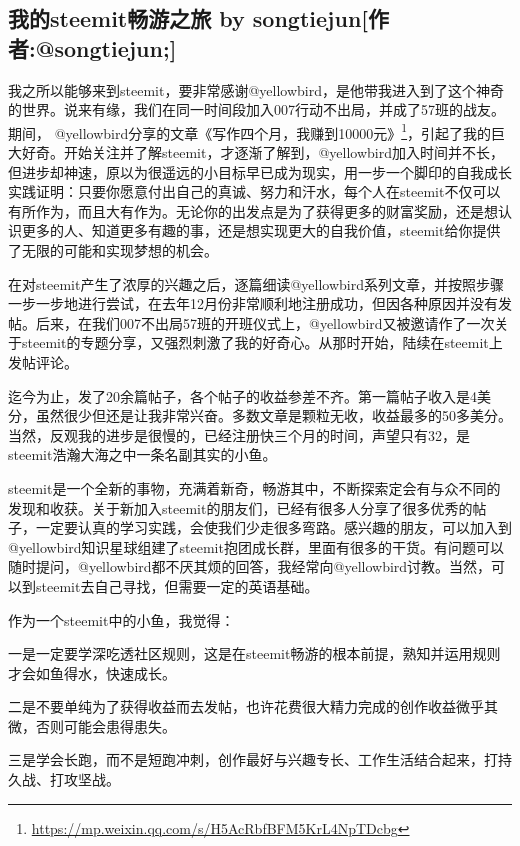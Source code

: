 \documentclass[]{ctexbook}
\renewcommand{\href}[2]{#2\footnote{\url{#1}}}
\begin{document}
\hypertarget{steemit-by-songtiejunsongtiejun}{%
\subsection{我的steemit畅游之旅 by songtiejun{[}作者:@songtiejun;{]}}\label{steemit-by-songtiejunsongtiejun}}

我之所以能够来到steemit，要非常感谢@yellowbird，是他带我进入到了这个神奇的世界。说来有缘，我们在同一时间段加入007行动不出局，并成了57班的战友。期间， @yellowbird分享的文章\href{https://mp.weixin.qq.com/s/H5AcRbfBFM5KrL4NpTDcbg}{《写作四个月，我赚到10000元》}，引起了我的巨大好奇。开始关注并了解steemit，才逐渐了解到，@yellowbird加入时间并不长，但进步却神速，原以为很遥远的小目标早已成为现实，用一步一个脚印的自我成长实践证明：只要你愿意付出自己的真诚、努力和汗水，每个人在steemit不仅可以有所作为，而且大有作为。无论你的出发点是为了获得更多的财富奖励，还是想认识更多的人、知道更多有趣的事，还是想实现更大的自我价值，steemit给你提供了无限的可能和实现梦想的机会。

在对steemit产生了浓厚的兴趣之后，逐篇细读@yellowbird系列文章，并按照步骤一步一步地进行尝试，在去年12月份非常顺利地注册成功，但因各种原因并没有发帖。后来，在我们007不出局57班的开班仪式上，@yellowbird又被邀请作了一次关于steemit的专题分享，又强烈刺激了我的好奇心。从那时开始，陆续在steemit上发帖评论。

迄今为止，发了20余篇帖子，各个帖子的收益参差不齐。第一篇帖子收入是4美分，虽然很少但还是让我非常兴奋。多数文章是颗粒无收，收益最多的50多美分。当然，反观我的进步是很慢的，已经注册快三个月的时间，声望只有32，是steemit浩瀚大海之中一条名副其实的小鱼。

steemit是一个全新的事物，充满着新奇，畅游其中，不断探索定会有与众不同的发现和收获。关于新加入steemit的朋友们，已经有很多人分享了很多优秀的帖子，一定要认真的学习实践，会使我们少走很多弯路。感兴趣的朋友，可以加入到@yellowbird知识星球组建了steemit抱团成长群，里面有很多的干货。有问题可以随时提问，@yellowbird都不厌其烦的回答，我经常向@yellowbird讨教。当然，可以到steemit去自己寻找，但需要一定的英语基础。

作为一个steemit中的小鱼，我觉得：

一是一定要学深吃透社区规则，这是在steemit畅游的根本前提，熟知并运用规则才会如鱼得水，快速成长。

二是不要单纯为了获得收益而去发帖，也许花费很大精力完成的创作收益微乎其微，否则可能会患得患失。

三是学会长跑，而不是短跑冲刺，创作最好与兴趣专长、工作生活结合起来，打持久战、打攻坚战。
\end{document}
